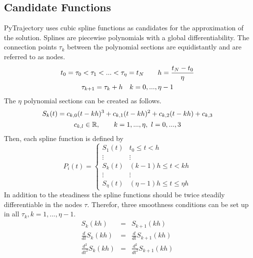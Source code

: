 \documentclass[letterpaper,10pt,english]{sphinxmanual}
\begin{document}
\subsection{Candidate Functions}
\label{guide/background:candidate-functions}\label{guide/background:id2}
PyTrajectory uses cubic spline functions as candidates for the approximation of the
solution. Splines are piecewise polynomials with a global differentiability.
The connection points \(\tau_k\) between the polynomial sections are equidistantly
and are referred to as nodes.
\begin{gather}
\begin{split}t_0 = \tau_0 < \tau_1 < ... < \tau_{\eta} = t_N \qquad h = \frac{t_N - t_0}{\eta}\end{split}\notag\\\begin{split}\tau_{k+1} = \tau_k + h \quad k = 0,...,\eta-1\end{split}\notag
\end{gather}
The \(\eta\) polynomial sections can be created as follows.
\begin{gather}
\begin{split}S_k(t) = c_{k,0}(t-k h)^3 + c_{k,1}(t-k h)^2 + c_{k,2}(t-k h) + c_{k,3}\end{split}\notag\\\begin{split}c_{k,l} \in \mathbb{R},\qquad k = 1,...,\eta,\ l = 0,...,3\end{split}\notag
\end{gather}
Then, each spline function is defined by
\begin{equation*}
   P_i(t) =
   \begin{cases}
      S_1(t) & t_0 \leq t < h \\
      \vdots & \vdots \\
      S_k(t) & (k-1)h \leq t < k h \\
      \vdots & \vdots \\
      S_\eta(t) & (\eta-1)h \leq t \leq \eta h
   \end{cases}
\end{equation*}
In addition to the steadiness the spline functions should be twice steadily differentiable in
the nodes \(\tau\). Therefor, three smoothness conditions can be set up in all
\(\tau_k, k = 1,...,\eta-1\).
\begin{eqnarray*}
   S_k(k h) & = & S_{k+1}(k h) \\
   \frac{d}{d t} S_k(k h) & = & \frac{d}{d t} S_{k+1}(k h) \\
   \frac{d^2}{d t^2} S_k(k h) & = & \frac{d^2}{d t^2} S_{k+1}(k h)
\end{eqnarray*}
\end{document}
